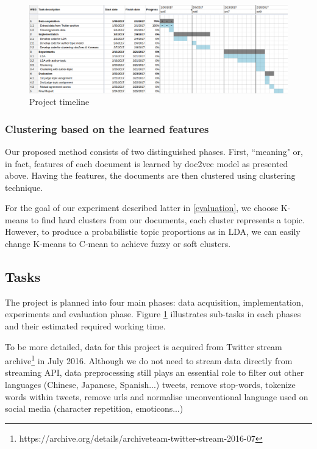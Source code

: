 \documentclass[conference,compsoc]{IEEEtran}
\begin{document}
\begin{figure}[tb]
	\centering
	\includegraphics[width=\textwidth]{project_timeline}
	\caption{Project timeline}
	\label{fig:project_timeline}
\end{figure}

\subsubsection{Clustering based on the learned features}
Our proposed method consists of two distinguished phases. First, ``meaning" or, in fact, features of each document is learned by doc2vec model as presented above. Having the features, the documents are then clustered using clustering technique. 

For the goal of our experiment described latter in \ref{evaluation}, we choose K-means to find hard clusters from our documents, each cluster represents a topic. However, to produce a probabilistic topic proportions as in LDA, we can easily change K-means to C-mean to achieve fuzzy or soft clusters.

\subsection{Tasks} \label{tasks}

The project is planned into four main phases: data acquisition, implementation, experiments and evaluation phase. Figure \ref{fig:project_timeline} illustrates sub-tasks in each phases and their estimated required working time.


To be more detailed, data for this project is acquired from Twitter stream archive\footnote{https://archive.org/details/archiveteam-twitter-stream-2016-07} in July 2016. Although we do not need to stream data directly from streaming API, data preprocessing still plays an essential role to filter out other languages (Chinese, Japanese, Spanish...) tweets, remove stop-words, tokenize words within tweets, remove urls and normalise unconventional language used on social media (character repetition, emoticons...)
\end{document}
